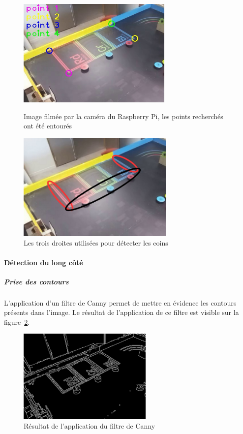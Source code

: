 \documentclass{article}
\begin{document}
\begin{figure}[!h]
   \begin{minipage}[t]{.46\linewidth}
      \begin{center}
      \includegraphics[height=150pt]{image_4_points.jpg}
      \end{center}
      \caption{Image filmée par la caméra du Raspberry Pi, les points recherchés ont été entourés}
      \label{image_init}
   \end{minipage} \hfill
   \begin{minipage}[t]{.46\linewidth}
      \begin{center}
      \includegraphics[height=150pt]{image_3_droites.jpg}
      \end{center}
      \caption{Les trois droites utilisées pour détecter les coins}
      \label{3droites}
   \end{minipage}
\end{figure}


\paragraph{Détection du long côté}
\subparagraph{Prise des contours}
L’application d’un filtre de Canny permet de mettre en évidence les contours présents dans l’image.
Le résultat de l’application de ce filtre est visible sur la figure~\ref{canny1}.
\begin{figure}[!h]
\begin{center} 
\includegraphics[height=130pt]{image_Canny.png}  
\end{center}
\caption{Résultat de l'application du filtre de Canny}
\label{canny1}
\end{figure}
\end{document}
